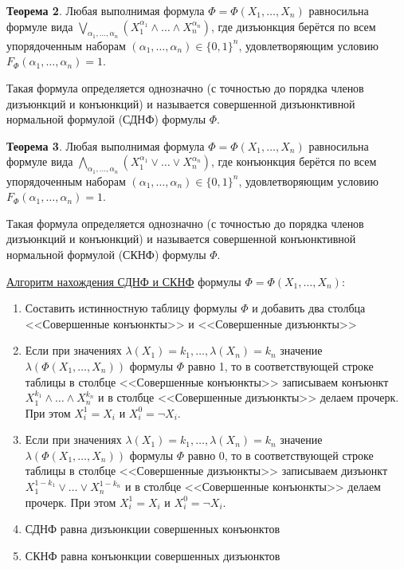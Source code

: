 \textbf{Теорема 2}. Любая выполнимая формула $\Phi = \Phi(X_1, \dots, X_n)$ равносильна формуле вида $\bigvee\limits_{\alpha_1,\dots,\alpha_n}(X_1^{\alpha_1} \land \dots \land X_n^{\alpha_n})$, где дизъюнкция берётся по всем упорядоченным наборам $(\alpha_1, \dots, \alpha_n) \in \{0,1\}^n$, удовлетворяющим условию $F_\Phi(\alpha_1, \dots, \alpha_n) = 1$.

Такая формула определяется однозначно (с точностью до порядка членов дизъюнкций и конъюнкций) и называется совершенной дизъюнктивной нормальной формулой (СДНФ) формулы $\Phi$.

\textbf{Теорема 3}. Любая выполнимая формула $\Phi = \Phi(X_1, \dots, X_n)$ равносильна формуле вида $\bigwedge\limits_{\alpha_1,\dots,\alpha_n}(X_1^{\alpha_1} \lor \dots \lor X_n^{\alpha_n})$, где конъюнкция берётся по всем упорядоченным наборам $(\alpha_1, \dots, \alpha_n) \in \{0,1\}^n$, удовлетворяющим условию $F_\Phi(\alpha_1, \dots, \alpha_n) = 1$.

Такая формула определяется однозначно (с точностью до порядка членов дизъюнкций и конъюнкций) и называется совершенной конъюнктивной нормальной формулой (СКНФ) формулы $\Phi$.

\underline{Алгоритм нахождения СДНФ и СКНФ} формулы $\Phi=\Phi(X_1,\dots,X_n)$:
\begin{enumerate}
    \item Составить истинностную таблицу формулы $\Phi$ и добавить два столбца <<Совершенные конъюнкты>> и <<Совершенные дизъюнкты>>
    \item Если при значениях $\lambda(X_1) = k_1, \dots, \lambda(X_n) = k_n$ значение $\lambda(\Phi(X_1,\dots,X_n))$ формулы $\Phi$ равно 1, то в соответствующей строке таблицы в столбце <<Совершенные конъюнкты>> записываем конъюнкт $X_1^{k_1} \land \dots \land X_n^{k_n}$ и в столбце <<Совершенные дизъюнкты>> делаем прочерк. При этом $X_i^1 = X_i$ и $X_i^0 = \lnot X_i$.
    \item Если при значениях $\lambda(X_1) = k_1, \dots, \lambda(X_n) = k_n$ значение $\lambda(\Phi(X_1,\dots,X_n))$ формулы $\Phi$ равно 0, то в соответствующей строке таблицы в столбце <<Совершенные дизъюнкты>> записываем дизъюнкт $X_1^{1-k_1} \lor \dots \lor X_n^{1-k_n}$ и в столбце <<Совершенные конъюнкты>> делаем прочерк. При этом $X_i^1 = X_i$ и $X_i^0 = \lnot X_i$.
    \item СДНФ равна дизъюнкции совершенных конъюнктов
    \item СКНФ равна конъюнкции совершенных дизъюнктов
\end{enumerate}

